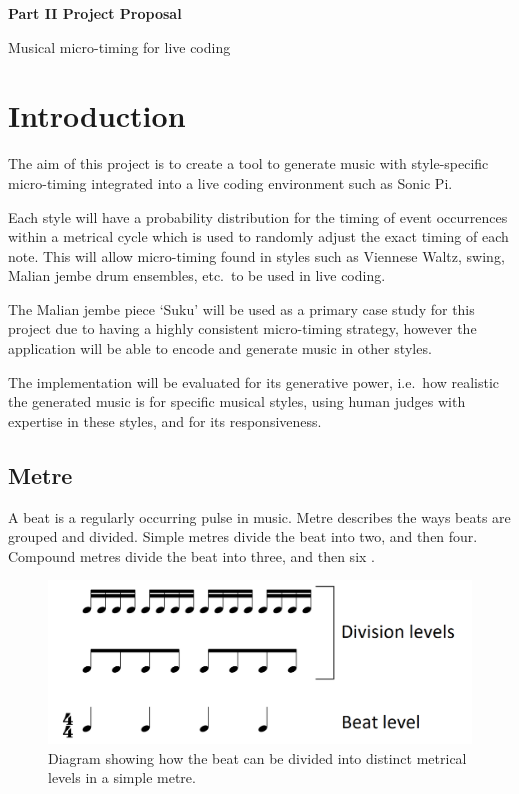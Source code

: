 \documentclass[12pt,twoside,openright]{report}
\begin{document}
\begin{refsection}

\begin{center}
    \Large \bf Part II Project Proposal

    Musical micro-timing for live coding
\end{center}

\section*{Introduction}

The aim of this project is to create a tool to generate music with
style-specific micro-timing integrated into a live coding environment such as
Sonic Pi.

Each style will have a probability distribution for the timing of event
occurrences within a metrical cycle which is used to randomly adjust the exact
timing of each note. This will allow micro-timing found in styles such as
Viennese Waltz, swing, Malian jembe drum ensembles, etc.\ to be used in live
coding.

The Malian jembe piece `Suku' will be used as a primary case study for this
project due to having a highly consistent micro-timing strategy, however the
application will be able to encode and generate music in other styles.

The implementation will be evaluated for its generative power, i.e.\ how
realistic the generated music is for specific musical styles, using human judges
with expertise in these styles, and for its responsiveness.


\subsection*{Metre}

A beat is a regularly occurring pulse in music. Metre describes the ways beats
are grouped and divided. Simple metres divide the beat into two, and then four.
Compound metres divide the beat into three, and then six \cite{omt2021}.

\begin{figure}[ht]
    \includegraphics[width=0.6\linewidth]{figures/proposal/metre example.png}
    \caption{Diagram showing how the beat can be divided into distinct metrical levels in a simple metre.}
    \label{fig:proposal_metre_example}
\end{figure}


\end{refsection}
\end{document}
